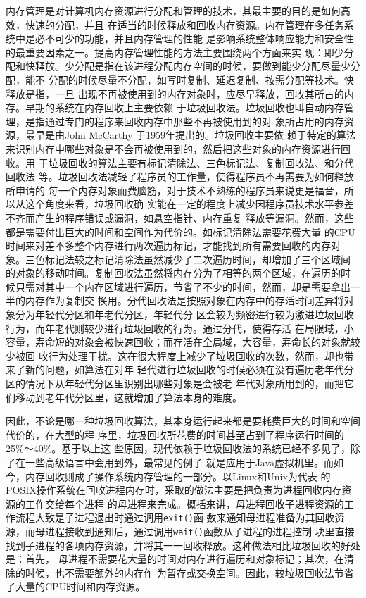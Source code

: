 \documentclass{swfuthesism}
\begin{document}
内存管理是对计算机内存资源进行分配和管理的技术，其最主要的目的是如何高效，快速的分配，并且
在适当的时候释放和回收内存资源。内存管理在多任务系统中是必不可少的功能，并且内存管理的性能
是影响系统整体响应能力和安全性的最重要因素之一。提高内存管理性能的方法主要围绕两个方面来实
现：即少分配和快释放。少分配是指在该进程分配内存空间的时候，要做到能少分配尽量少分配，能不
分配的时候尽量不分配，如写时复制、延迟复制、按需分配等技术\cite{Bhat2017}。快释放是指，一旦
出现不再被使用到的内存对象时，应尽早释放，回收其所占的内存。早期的系统在内存回收上主要依赖
于垃圾回收法。垃圾回收也叫自动内存管理，是指通过专门的程序来回收内存中那些不再被使用到的对
象所占用的内存资源，最早是由John McCarthy 于1959年提出的\cite{McCarthy1960}。垃圾回收主要依
赖于特定的算法来识别内存中哪些对象是不会再被使用到的，然后把这些对象的内存资源进行回收。用
于垃圾回收的算法主要有标记清除法、三色标记法、复制回收法、和分代回收法
等\cite{wiki:garbage}。垃圾回收法减轻了程序员的工作量，使得程序员不再需要为如何释放所申请的
每一个内存对象而费脑筋，对于技术不熟练的程序员来说更是福音，所以从这个角度来看，垃圾回收确
实能在一定的程度上减少因程序员技术水平参差不齐而产生的程序错误或漏洞，如悬空指针、内存重复
释放等漏洞。然而，这些都是需要付出巨大的时间和空间作为代价的。如标记清除法需要花费大量
的CPU时间来对差不多整个内存进行两次遍历标记，才能找到所有需要回收的内存对
象\cite{McCarthy:1978}。三色标记法较之标记清除法虽然减少了二次遍历时间，却增加了三个区域间
的对象的移动时间\cite{wiki:dijkstra}。复制回收法虽然将内存分为了相等的两个区域，在遍历的时
候只需对其中一个内存区域进行遍历，节省了不少的时间，然而，却是需要拿出一半的内存作为复制交
换用。分代回收法是按照对象在内存中的存活时间差异将对象分为年轻代分区和年老代分区，年轻代分
区会较为频密进行较为激进垃圾回收行为，而年老代则较少进行垃圾回收的行为。通过分代，使得存活
在局限域，小容量，寿命短的对象会被快速回收；而存活在全局域，大容量，寿命长的对象就较少被回
收行为处理干扰。这在很大程度上减少了垃圾回收的次数，然而，却也带来了新的问题，如算法在对年
轻代进行垃圾回收的时候必须在没有遍历老年代分区的情况下从年轻代分区里识别出哪些对象是会被老
年代对象所用到的，而把它们移动到老年代分区里，这就增加了算法本身的难度。

因此，不论是哪一种垃圾回收算法，其本身运行起来都是要耗费巨大的时间和空间代价的，在大型的程
序里，垃圾回收所花费的时间甚至占到了程序运行时间的25\%～40\%\cite{Johnson1992}。基于以上这
些原因，现代依赖于垃圾回收法的系统已经不多见了，除了在一些高级语言中会用到外，最常见的例子
就是应用于Java虚拟机里。而如今，内存回收则成了操作系统内存管理的一部分。以Linux和Unix为代表
的POSIX操作系统在回收进程内存时，采取的做法主要是把负责为进程回收内存资源的工作交给每个进程
的母进程来完成。概括来讲，母进程回收子进程资源的工作流程大致是子进程退出时通过调用\texttt{exit()}函
数来通知母进程准备为其回收资源，而母进程接收到通知后，通过调用\texttt{wait()}函数从子进程的进程控制
块里直接找到子进程的各项内存资源，并将其一一回收释放。这种做法相比垃圾回收的好处是：首先，
母进程不需要花大量的时间对内存进行遍历和对象标记；其次，在清除的时候，也不需要额外的内存作
为暂存或交换空间。因此，较垃圾回收法节省了大量的CPU时间和内存资源。
\end{document}
